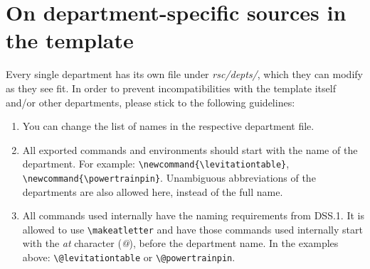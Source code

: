 \section*{On department-specific sources in the template} \label{sec:deptartment-specific-sources}

Every single department has its own file under \textit{rsc/depts/}, which they can modify as they see fit. In order to prevent incompatibilities with the template itself and/or other departments, please stick to the following guidelines:

\begin{enumerate}[label=DSS.\arabic*]
    \item You can change the list of names in the respective department file. 
    \item All exported commands and environments should start with the name of the department. For example: \verb|\newcommand{\levitationtable}|, \verb|\newcommand{\powertrainpin}|. Unambiguous abbreviations of the departments are also allowed here, instead of the full name.
    \item All commands used internally have the naming requirements from DSS.1. It is allowed to use \verb|\makeatletter| and have those commands used internally start with the \textit{at} character (\textit{@}), before the department name. In the examples above: \verb|\@levitationtable| or \verb|\@powertrainpin|.
\end{enumerate}
